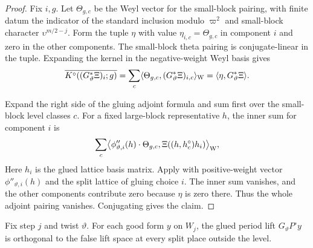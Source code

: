 \begin{proof}
Fix $i,g$. Let $\Theta_{g,c}$ be the Weyl vector for the small-block pairing, with finite datum the indicator of the standard inclusion modulo $\varpi^2$ and small-block character $\upsilon^{m/2-j}$. Form the tuple $\eta$ with value $\eta_{i,c}=\Theta_{g,c}$ in component $i$ and zero in the other components. The small-block theta pairing is conjugate-linear in the tuple. Expanding the kernel in the negative-weight Weyl basis gives
\[
 \overline{K^\circ((G_\vartheta^*\Xi)_i;g)}
 =\sum_c\langle\Theta_{g,c},(G_\vartheta^*\Xi)_{i,c}\rangle_{\rm W}
 =\langle\eta,G_\vartheta^*\Xi\rangle .
\]

Expand the right side of the gluing adjoint formula and sum first over the small-block level classes $c$. For a fixed large-block representative $h$, the inner sum for component $i$ is
\[
 \sum_c
 \bigl\langle \phi''_{\vartheta,i}(h)\cdot\Theta_{g,c},
       \Xi((h,h_c^\circ)h_i)\bigr\rangle_{\rm W},
\]
Here $h_i$ is the glued lattice basis matrix. Apply  with positive-weight vector $\phi''_{\vartheta,i}(h)$ and the split lattice of gluing choice $i$. The inner sum vanishes, and the other components contribute zero because $\eta$ is zero there. Thus the whole adjoint pairing vanishes. Conjugating gives the claim.
\end{proof}

\begin{lemma}
\label{lem:c-false-orthogonality}
\emitthmsource
Fix step $j$ and twist $\vartheta$. For each good form $y$ on $W_j$, the glued period lift $G_\vartheta P^\circ y$ is orthogonal to the false lift space at every split place outside the level.
\end{lemma}


